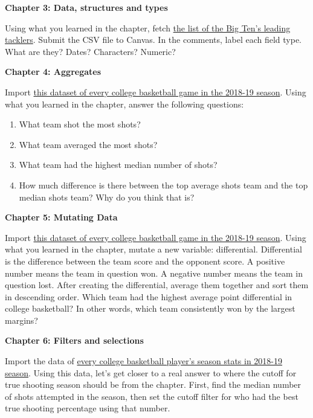 \documentclass[]{book}
\providecommand{\tightlist}{%
  \setlength{\itemsep}{0pt}\setlength{\parskip}{0pt}}
\begin{document}
\textbf{Chapter 3: Data, structures and types}

Using what you learned in the chapter, fetch \href{http://www.cfbstats.com/2018/leader/827/player/split01/category19/sort01.html}{the list of the Big Ten's leading tacklers}. Submit the CSV file to Canvas. In the comments, label each field type. What are they? Dates? Characters? Numeric?

\textbf{Chapter 4: Aggregates}

Import \href{https://unl.box.com/s/a8m91bro10t89watsyo13yjegb1fy009}{this dataset of every college basketball game in the 2018-19 season}. Using what you learned in the chapter, answer the following questions:

\begin{enumerate}
\def\labelenumi{\arabic{enumi}.}
\tightlist
\item
  What team shot the most shots?
\item
  What team averaged the most shots?
\item
  What team had the highest median number of shots?
\item
  How much difference is there between the top average shots team and the top median shots team? Why do you think that is?
\end{enumerate}

\textbf{Chapter 5: Mutating Data}

Import \href{https://unl.box.com/s/a8m91bro10t89watsyo13yjegb1fy009}{this dataset of every college basketball game in the 2018-19 season}. Using what you learned in the chapter, mutate a new variable: differential. Differential is the difference between the team score and the opponent score. A positive number means the team in question won. A negative number means the team in question lost. After creating the differential, average them together and sort them in descending order. Which team had the highest average point differential in college basketball? In other words, which team consistently won by the largest margins?

\textbf{Chapter 6: Filters and selections}

Import the data of \href{https://unl.box.com/s/s1wzw61u9ia50qmirfhuvprgpmmah9rj}{every college basketball player's season stats in 2018-19 season}. Using this data, let's get closer to a real answer to where the cutoff for true shooting season should be from the chapter. First, find the median number of shots attempted in the season, then set the cutoff filter for who had the best true shooting percentage using that number.
\end{document}
